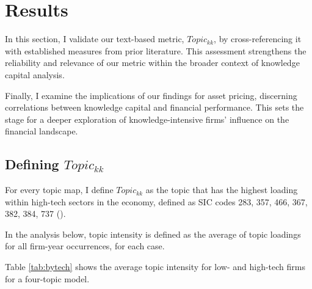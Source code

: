 \documentclass[12pt, letterpaper]{article}
\begin{document}
\tiny

\normalsize







\section{Results}

In this section, I validate our text-based metric, $Topic_{kk}$, by cross-referencing it with established measures from prior literature. This assessment strengthens the reliability and relevance of our metric within the broader context of knowledge capital analysis.

Finally, I examine the implications of our findings for asset pricing, discerning correlations between knowledge capital and financial performance. This sets the stage for a deeper exploration of knowledge-intensive firms' influence on the financial landscape.

\subsection{Defining $Topic_{kk}$}

For every topic map, I define $Topic_{kk}$ as the topic that has the highest loading within high-tech sectors in the economy, defined as SIC codes 283, 357, 466, 367, 382, 384, 737 (\cite{Brown2009-zp}). 

In the analysis below, topic intensity is defined as the average of topic loadings for all firm-year occurrences, for each case.

Table \ref{tab:bytech} shows the average topic intensity for low- and high-tech firms for a four-topic model. 


\end{document}
